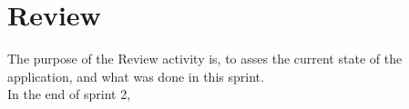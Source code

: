 \section{Review}

The purpose of the Review activity is, to asses the current state of the application, and what was done in this sprint.\\
In the end of sprint 2, 